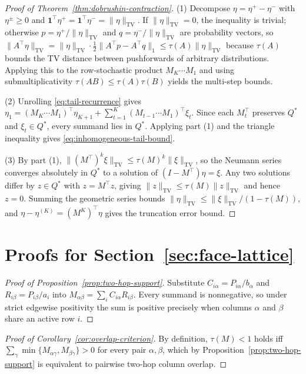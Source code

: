 \documentclass[10pt]{article}
\newcommand{\one}{\mathbf{1}}
\newcommand{\TV}{\mathrm{TV}}
\begin{document}
\begin{proof}[Proof of Theorem~\ref{thm:dobrushin-contraction}]
(1) Decompose $\eta = \eta^+ - \eta^-$ with $\eta^\pm \ge 0$ and $\one^\top \eta^+ = \one^\top \eta^- = \|\eta\|_{\TV}$. If $\|\eta\|_{\TV} = 0$, the inequality is trivial; otherwise $p = \eta^+/\|\eta\|_{\TV}$ and $q = \eta^-/\|\eta\|_{\TV}$ are probability vectors, so $\|A^\top \eta\|_{\TV} = \|\eta\|_{\TV} \cdot \frac{1}{2}\|A^\top p - A^\top q\|_1 \le \tau(A)\|\eta\|_{\TV}$ because $\tau(A)$ bounds the TV distance between pushforwards of arbitrary distributions. Applying this to the row-stochastic product $M_K \cdots M_1$ and using submultiplicativity $\tau(AB) \le \tau(A)\tau(B)$ yields the multi-step bounds.

(2) Unrolling \eqref{eq:tail-recurrence} gives $\eta_1 = (M_K \cdots M_1)^\top \eta_{K+1} + \sum_{t=1}^K (M_{t-1}\cdots M_1)^\top \xi_t$. Since each $M_t^\top$ preserves $Q^*$ and $\xi_t \in Q^*$, every summand lies in $Q^*$. Applying part (1) and the triangle inequality gives \eqref{eq:inhomogeneous-tail-bound}.

(3) By part (1), $\|(M^\top)^k \xi\|_{\TV} \le \tau(M)^k \|\xi\|_{\TV}$, so the Neumann series converges absolutely in $Q^*$ to a solution of $(I - M^\top)\eta = \xi$. Any two solutions differ by $z \in Q^*$ with $z = M^\top z$, giving $\|z\|_{\TV} \le \tau(M)\|z\|_{\TV}$ and hence $z = 0$. Summing the geometric series bounds $\|\eta\|_{\TV} \le \|\xi\|_{\TV}/(1-\tau(M))$, and $\eta - \eta^{(K)} = (M^K)^\top \eta$ gives the truncation error bound.
\end{proof}

\section{Proofs for Section~\ref{sec:face-lattice}}
\label{app:face-proofs}

\begin{proof}[Proof of Proposition~\ref{prop:two-hop-support}]
Substitute $C_{i\alpha} = P_{i\alpha}/b_\alpha$ and $R_{i\beta} = P_{i\beta}/a_i$ into $M_{\alpha\beta} = \sum_i C_{i\alpha} R_{i\beta}$. Every summand is nonnegative, so under strict edgewise positivity the sum is positive precisely when columns $\alpha$ and $\beta$ share an active row $i$.
\end{proof}

\begin{proof}[Proof of Corollary~\ref{cor:overlap-criterion}]
By definition, $\tau(M) < 1$ holds iff $\sum_\gamma \min\{M_{\alpha\gamma}, M_{\beta\gamma}\} > 0$ for every pair $\alpha,\beta$, which by Proposition~\ref{prop:two-hop-support} is equivalent to pairwise two-hop column overlap.
\end{proof}
\end{document}
